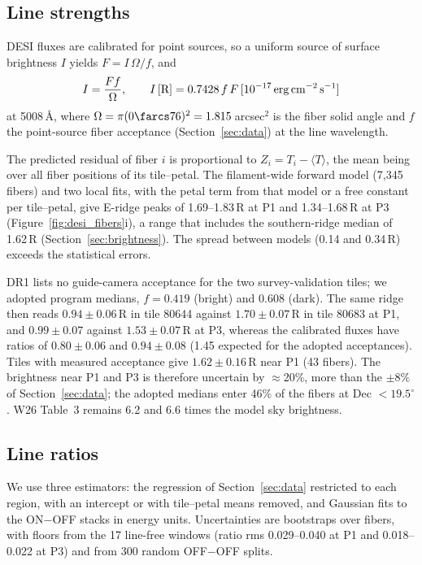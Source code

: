 \subsection{Line strengths}

DESI fluxes are calibrated for point sources, so a uniform source of surface brightness $I$ yields $F=I\,\Omega/f$, and
\begin{equation}
I=\frac{F f}{\Omega},\qquad I\,[{\rm R}]=0.7428\,f\,F\,[10^{-17}\,{\rm erg\,cm^{-2}\,s^{-1}}]
\label{eq:desi_sb}
\end{equation}
at 5008\,\AA, where $\Omega=\pi(0\farcs76)^2=1.815$\,arcsec$^2$ is the fiber solid angle and $f$ the point-source fiber acceptance (Section~\ref{sec:data}) at the line wavelength.

The predicted residual of fiber $i$ is proportional to $Z_i=T_i-\langle T\rangle$, the mean being over all fiber positions of its tile--petal. The filament-wide forward model (7,345 fibers) and two local fits, with the petal term from that model or a free constant per tile--petal, give E-ridge peaks of 1.69--1.83\,R at P1 and 1.34--1.68\,R at P3 (Figure~\ref{fig:desi_fibers}i), a range that includes the southern-ridge median of 1.62\,R (Section~\ref{sec:brightness}). The spread between models (0.14 and 0.34\,R) exceeds the statistical errors.

DR1 lists no guide-camera acceptance for the two survey-validation tiles; we adopted program medians, $f=0.419$ (bright) and 0.608 (dark). The same ridge then reads $0.94\pm0.06$\,R in tile 80644 against $1.70\pm0.07$\,R in tile 80683 at P1, and $0.99\pm0.07$ against $1.53\pm0.07$\,R at P3, whereas the calibrated fluxes have ratios of $0.80\pm0.06$ and $0.94\pm0.08$ (1.45 expected for the adopted acceptances). Tiles with measured acceptance give $1.62\pm0.16$\,R near P1 (43 fibers). The brightness near P1 and P3 is therefore uncertain by $\approx$20\%, more than the $\pm8\%$ of Section~\ref{sec:data}; the adopted medians enter 46\% of the fibers at Dec $<19.5^\circ$. W26 Table~3 remains 6.2 and 6.6 times the model sky brightness.

\subsection{Line ratios}

We use three estimators: the regression of Section~\ref{sec:data} restricted to each region, with an intercept or with tile--petal means removed, and Gaussian fits to the ON$-$OFF stacks in energy units. Uncertainties are bootstraps over fibers, with floors from the 17 line-free windows (ratio rms 0.029--0.040 at P1 and 0.018--0.022 at P3) and from 300 random OFF$-$OFF splits.


